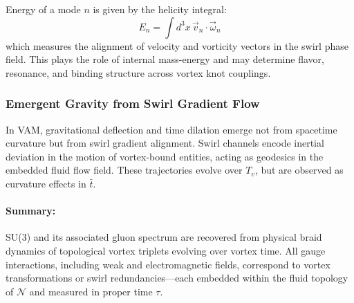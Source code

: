 Energy of a mode \(n\) is given by the helicity integral:
\[
E_n = \int d^3x \, \vec{v}_n \cdot \vec{\omega}_n
\]
which measures the alignment of velocity and vorticity vectors in the swirl phase field. This plays the role of internal mass-energy and may determine flavor, resonance, and binding structure across vortex knot couplings.

\subsubsection*{Emergent Gravity from Swirl Gradient Flow}

In VAM, gravitational deflection and time dilation emerge not from spacetime curvature but from swirl gradient alignment. Swirl channels encode inertial deviation in the motion of vortex-bound entities, acting as geodesics in the embedded fluid flow field. These trajectories evolve over $T_v$, but are observed as curvature effects in \( \bar{t} \).

\paragraph{Summary:} SU(3) and its associated gluon spectrum are recovered from physical braid dynamics of topological vortex triplets evolving over vortex time. All gauge interactions, including weak and electromagnetic fields, correspond to vortex transformations or swirl redundancies—each embedded within the fluid topology of \( \mathcal{N} \) and measured in proper time \( \tau \).


